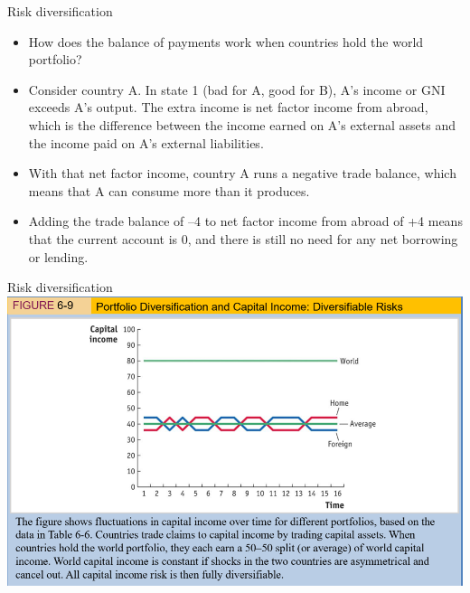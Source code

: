 \documentclass[
  ignorenonframetext,
]{beamer}
\begin{document}
\begin{frame}{Risk diversification}
\label{risk-diversification-3}
\begin{itemize}
\item
  How does the balance of payments work when countries hold the world
  portfolio?
\item
  Consider country A. In state 1 (bad for A, good for B), A's income or
  GNI exceeds A's output. The extra income is net factor income from
  abroad, which is the difference between the income earned on A's
  external assets and the income paid on A's external liabilities.
\item
  With that net factor income, country A runs a negative trade balance,
  which means that A can consume more than it produces.
\item
  Adding the trade balance of --4 to net factor income from abroad of +4
  means that the current account is 0, and there is still no need for
  any net borrowing or lending.
\end{itemize}
\end{frame}

\begin{frame}{Risk diversification}
\label{risk-diversification-4}
\includegraphics{pic8.png}
\end{frame}
\end{document}
